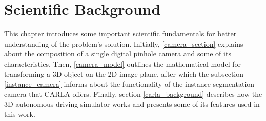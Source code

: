 \chapter{Scientific Background}
\label{background}




This chapter introduces some important scientific fundamentals for better understanding of the problem's solution. Initially, \ref{camera_section} explains about the composition of a single digital pinhole camera and some of its characteristics. Then, \ref{camera_model} outlines the mathematical model for transforming a 3D object on the 2D image plane, after which the subsection \ref{instance_camera} informs about the functionality of the instance segmentation camera that CARLA offers. Finally, section \ref{carla_background} describes how the 3D autonomous driving simulator works and presents some of its features used in this work.

